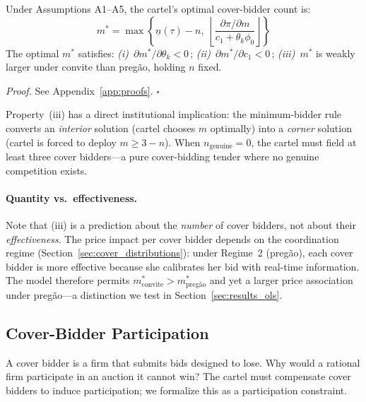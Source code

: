 \begin{proposition}
\label{prop:optimal_m}
Under Assumptions A1--A5, the cartel's optimal cover-bidder count is:
\begin{equation}
  m^* = \max\!\left\{\underline{n}(\tau) - n, \;
  \left\lfloor \frac{\partial \pi / \partial m}{c_1 + \theta_k \phi_0}
  \right\rfloor \right\}
  \label{eq:optimal_m}
\end{equation}
The optimal $m^*$ satisfies:
\emph{(i)}~$\partial m^* / \partial \theta_k < 0$\,;
\emph{(ii)}~$\partial m^* / \partial c_1 < 0$\,;
\emph{(iii)}~$m^*$ is weakly larger under convite than preg\~ao,
holding $n$ fixed.
\end{proposition}

\noindent\emph{Proof.} See Appendix~\ref{app:proofs}. \hfill$\square$

\medskip

Property~(iii) has a direct institutional implication: the
minimum-bidder rule converts an \emph{interior} solution (cartel
chooses $m$ optimally) into a \emph{corner} solution (cartel is
forced to deploy $m \geq 3 - n$). When $n_{\text{genuine}} = 0$,
the cartel must field at least three cover bidders---a pure
cover-bidding tender where no genuine competition exists.

\paragraph{Quantity vs.\ effectiveness.}
Note that (iii) is a prediction about the \emph{number} of cover
bidders, not about their \emph{effectiveness}. The price impact per
cover bidder depends on the coordination regime
(Section~\ref{sec:cover_distributions}): under Regime~2
(preg\~ao), each cover bidder is more effective because she
calibrates her bid with real-time information. The model therefore
permits $m^*_{\text{convite}} > m^*_{\text{preg\~ao}}$ and yet a
larger price association under preg\~ao---a distinction we test in
Section~\ref{sec:results_ols}.


\subsection{Cover-Bidder Participation}
\label{sec:cover_participation}

A cover bidder is a firm that submits bids designed to lose. Why
would a rational firm participate in an auction it cannot win? The
cartel must compensate cover bidders to induce participation; we
formalize this as a participation constraint.

